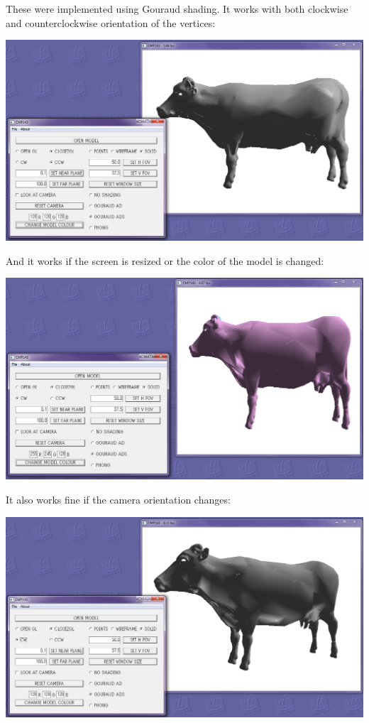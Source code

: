 \documentclass[12pt]{article}
\begin{document}
These were implemented using Gouraud shading.
\newpage
It works with both clockwise and counterclockwise orientation of the vertices:
\begin{center}
\includegraphics[scale=0.45]{7.png}
\end{center}
And it works if the screen is resized or the color of the model is changed:
\begin{center}
\includegraphics[scale=0.45]{6.png}
\end{center}
\newpage
It also works fine if the camera orientation changes:
\begin{center}
\includegraphics[scale=0.45]{8.png}
\end{center}
\end{document}
